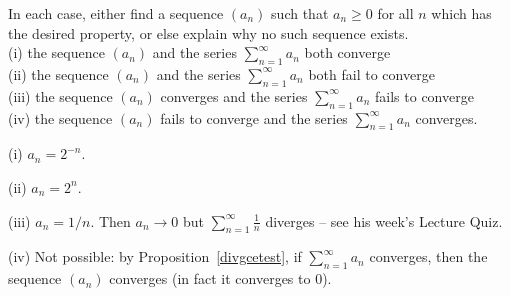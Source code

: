 \documentclass[11pt,dvipsnames]{book}
\numberwithin{figure}{section} %
\numberwithin{table}{section} %
\begin{document}
%
%
%
%
%
%
%
\begin{exercise}\label{eleven}
In each case, either find a sequence $(a_n)$ such that $a_n \geq 0$ for all $n$ which has the desired property, or else explain why no such sequence exists. \\

(i) the sequence $(a_n)$ and the series $\sum_{n=1}^\infty a_n$ both converge\\

(ii) the sequence $(a_n)$ and the series $\sum_{n=1}^\infty a_n$ both fail to converge\\

(iii) the sequence $(a_n)$ converges and the series $\sum_{n=1}^\infty a_n$ fails to converge\\

(iv) the sequence $(a_n)$ fails to converge and the series $\sum_{n=1}^\infty a_n$ converges.\\

\begin{solution}
(i) $a_n = 2^{-n}$.

(ii) $a_n = 2^n$.

(iii) $a_n = 1/n$. Then $a_n \to 0$ but $\sum_{n=1}^\infty \frac{1}{n}$ diverges -- see his week's Lecture Quiz.

(iv) Not possible: by Proposition~\ref{divgcetest}, if $\sum_{n=1}^\infty a_n$ converges, then the sequence $(a_n)$ converges (in fact it converges to $0$).
\end{solution}

\end{exercise}
\end{document}
